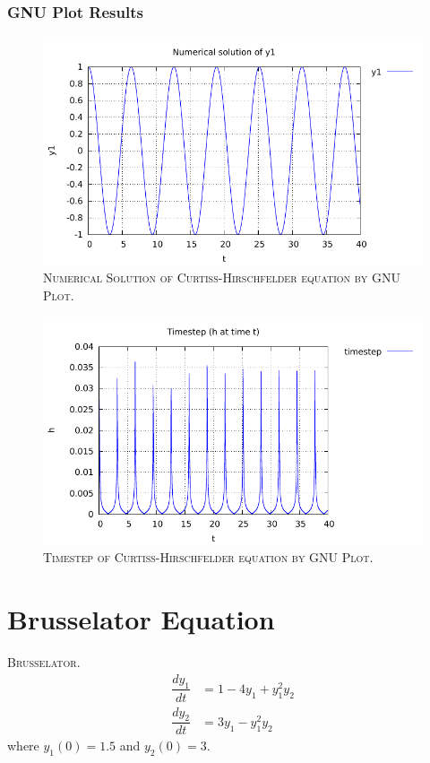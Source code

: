 \documentclass[a4paper,oneside]{book}
\numberwithin{equation}{chapter}
\begin{document}
\subsubsection{GNU Plot Results}
\begin{figure}[H]
\centering
\includegraphics[scale=1.15]{ch_1}
\caption{\textsc{Numerical Solution of Curtiss-Hirschfelder equation by GNU Plot.}}
\end{figure}
\begin{figure}[H]
\centering
\includegraphics[scale=1.15]{ch_ts}
\caption{\textsc{Timestep of Curtiss-Hirschfelder equation by GNU Plot.}}
\end{figure}
\section{Brusselator Equation}
\textsc{Brusselator.} 
\begin{align}
    \dfrac{dy_1}{dt}  &=  1 - 4y_1 + y_1^2 y_2
    \\
    \dfrac{dy_2}{dt}  &=  3y_1 - y_1^2 y_2
\end{align}
where $y_1\left(0\right) = 1.5$ and $y_2\left(0\right) = 3$.
\end{document}

